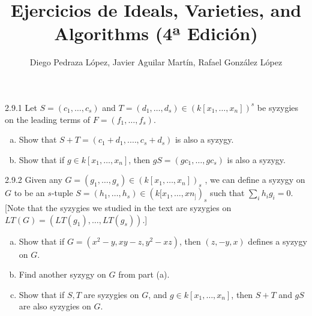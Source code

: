 \documentclass[twoside]{article}
\begin{document}
\title{Ejercicios de Ideals, Varieties, and Algorithms (4ª Edición)}
\author{Diego Pedraza López, Javier Aguilar Martín, Rafael González López}
\maketitle

\begin{ejercicio}{2.9.1}
Let $S = (c_1, \dots , c_s)$ and $T = (d_1, \dots , d_s) ∈ (k[x_1, \dots , x_n])^s$ be syzygies on the leading
terms of $F = (f_1, \dots , f_s)$.
\begin{enumerate}[a.]
\item Show that $S + T = (c_1 + d_1, . \dots , c_s + d_s)$ is also a syzygy.
\item Show that if $g ∈ k[x_1,\dots , x_n]$, then $g  S = (gc_1, \dots , gc_s)$ is also a syzygy.
\end{enumerate}
\end{ejercicio}

\begin{solucion}

\end{solucion}

\newpage

\begin{ejercicio}{2.9.2}
Given any $G = (g_1, \dots , g_s) ∈ (k[x_1, \dots , x_n])_s$ , we can define a syzygy on $G$ to be an $s$-tuple
$S = (h_1,\dots , h_s) ∈ (k[x_1, \dots , xn_])_s$ such that
$\sum_i h_ig_i = 0$. [Note that the syzygies
we studied in the text are syzygies on $LT(G) = (LT(g_1), \dots , LT(g_s))$.]
\begin{enumerate}[a.]
\item Show that if $G = (x^2 − y, xy − z, y^2 − xz)$, then $(z,−y, x)$ defines a syzygy on $G$.
\item Find another syzygy on $G$ from part (a).
\item Show that if $S, T$ are syzygies on $G$, and $g ∈ k[x_1,\dots , x_n]$, then $S+T$ and $gS$ are also
syzygies on $G$.

\end{enumerate}
\end{ejercicio}
\begin{solucion}

\end{solucion}
\newpage
\end{document}
